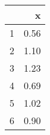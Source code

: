 \begin{table}[ht]
\begin{center}
\begin{tabular}{rr}
  \hline
 & x \\ 
  \hline
1 & 0.56 \\ 
  2 & 1.10 \\ 
  3 & 1.23 \\ 
  4 & 0.69 \\ 
  5 & 1.02 \\ 
  6 & 0.90 \\ 
   \hline
\end{tabular}
\end{center}
\end{table}
